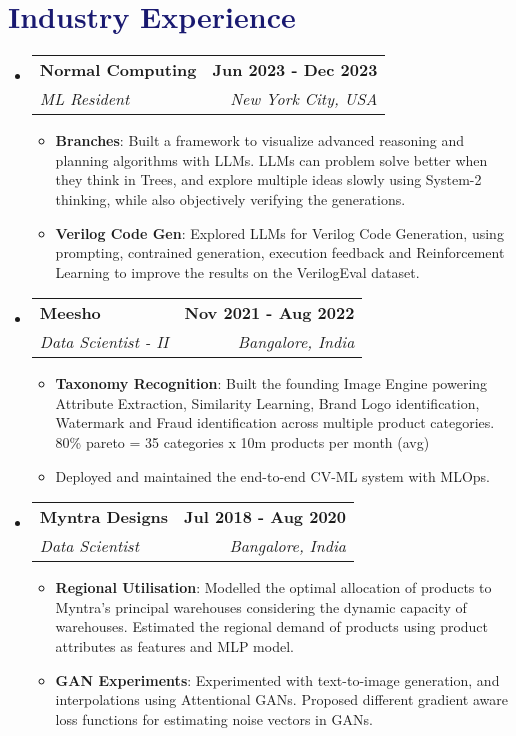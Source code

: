 \documentclass[letterpaper,10.7pt]{article}
\makeatletter
\newcommand{\resumeItem}[1]{
  \item\small{
    {#1 \vspace{-2pt}}
  }
}
\newcommand{\resumeSubheading}[4]{
  \vspace{-2pt}\item
    \begin{tabular*}{1.0\textwidth}[t]{l@{\extracolsep{\fill}}r}
      \textbf{#1} & \textbf{\small #2} \\
      \textit{\small#3} & \textit{\small #4} \\
    \end{tabular*}\vspace{-7pt}
}
\newcommand{\resumeSubHeadingListStart}{\begin{itemize}[leftmargin=0.0in, label={}]}
\newcommand{\resumeSubHeadingListEnd}{\end{itemize}}
\newcommand{\resumeItemListStart}{\begin{itemize}}
\newcommand{\resumeItemListEnd}{\end{itemize}\vspace{-5pt}}
\makeatother
\begin{document}
\vspace{-0.2in}
\section{\textcolor{MidnightBlue}{Industry Experience}}
\resumeSubHeadingListStart

\resumeSubheading
{Normal Computing}{Jun 2023 - Dec 2023}
{ML Resident}{New York City, USA}
\resumeItemListStart
\resumeItem{\textbf{Branches}: Built a framework to visualize advanced reasoning and planning algorithms with LLMs. LLMs can problem solve better when they think in Trees, and explore multiple ideas slowly using System-2 thinking, while also objectively verifying the generations. }
\resumeItem{\textbf{Verilog Code Gen}: Explored LLMs for Verilog Code Generation, using prompting, contrained generation, execution feedback and Reinforcement Learning to improve the results on the VerilogEval dataset.}
\resumeItemListEnd 

\resumeSubheading
{Meesho}{Nov 2021 - Aug 2022}
{Data Scientist - II}{Bangalore, India}
\resumeItemListStart
\resumeItem{\textbf{Taxonomy Recognition}: Built the founding Image Engine powering Attribute Extraction, Similarity Learning, Brand Logo identification, Watermark and Fraud identification across multiple product categories. 80\% pareto = 35 categories x 10m products per month (avg)}
\resumeItem{Deployed and maintained the end-to-end CV-ML system with MLOps.  \color{blue}{Project Impact: 30\% Reduction in cost = \$20M per year}} 
\resumeItemListEnd 

\resumeSubheading
{Myntra Designs}{Jul 2018 - Aug 2020}{Data Scientist}{Bangalore, India}
\resumeItemListStart
\resumeItem{\textbf{Regional Utilisation}: Modelled the optimal allocation of products to Myntra's principal warehouses considering the dynamic capacity of warehouses. Estimated the regional demand of products using product attributes as features and MLP model. \color{blue}{\href{https://arxiv.org/abs/2007.05081}{\color{blue}{[arxiv]}} \\ \color{blue}{Project Impact: 27\% Improvement in RU; 20\% Improvement in 2DD}}}
\resumeItem{\textbf{GAN Experiments}: Experimented with text-to-image generation, and interpolations using Attentional GANs. Proposed different gradient aware loss functions for estimating noise vectors in GANs.}
\resumeItemListEnd
\resumeSubHeadingListEnd
\end{document}
